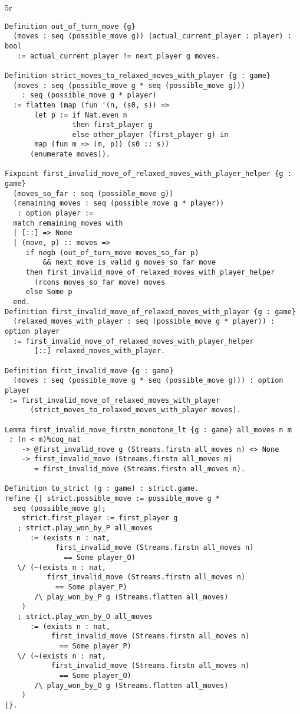 5r\documentclass{article}
\theoremstyle{definition}
\begin{document}
\begin{verbatim}
Definition out_of_turn_move {g}
  (moves : seq (possible_move g)) (actual_current_player : player) : bool
   := actual_current_player != next_player g moves.

Definition strict_moves_to_relaxed_moves_with_player {g : game}
  (moves : seq (possible_move g * seq (possible_move g)))
    : seq (possible_move g * player)
  := flatten (map (fun '(n, (s0, s)) =>
       let p := if Nat.even n
                then first_player g
                else other_player (first_player g) in
       map (fun m => (m, p)) (s0 :: s))
      (enumerate moves)).

Fixpoint first_invalid_move_of_relaxed_moves_with_player_helper {g : game}
  (moves_so_far : seq (possible_move g))
  (remaining_moves : seq (possible_move g * player))
   : option player := 
  match remaining_moves with 
  | [::] => None
  | (move, p) :: moves => 
     if negb (out_of_turn_move moves_so_far p)
         && next_move_is_valid g moves_so_far move 
     then first_invalid_move_of_relaxed_moves_with_player_helper 
       (rcons moves_so_far move) moves
     else Some p
  end.
Definition first_invalid_move_of_relaxed_moves_with_player {g : game}
  (relaxed_moves_with_player : seq (possible_move g * player)) : option player
  := first_invalid_move_of_relaxed_moves_with_player_helper
       [::] relaxed_moves_with_player.

Definition first_invalid_move {g : game}
  (moves : seq (possible_move g * seq (possible_move g))) : option player
 := first_invalid_move_of_relaxed_moves_with_player
      (strict_moves_to_relaxed_moves_with_player moves).  

Lemma first_invalid_move_firstn_monotone_lt {g : game} all_moves n m
 : (n < m)%coq_nat
    -> @first_invalid_move g (Streams.firstn all_moves n) <> None
    -> first_invalid_move (Streams.firstn all_moves m)
       = first_invalid_move (Streams.firstn all_moves n).
       
Definition to_strict (g : game) : strict.game.
refine {| strict.possible_move := possible_move g * 
  seq (possible_move g);
    strict.first_player := first_player g
   ; strict.play_won_by_P all_moves
      := (exists n : nat,
            first_invalid_move (Streams.firstn all_moves n) 
              == Some player_O) 
   \/ (~(exists n : nat,
          first_invalid_move (Streams.firstn all_moves n) 
            == Some player_P)
       /\ play_won_by_P g (Streams.flatten all_moves)
    ) 
   ; strict.play_won_by_O all_moves
      := (exists n : nat,
           first_invalid_move (Streams.firstn all_moves n) 
             == Some player_P) 
   \/ (~(exists n : nat,
           first_invalid_move (Streams.firstn all_moves n) 
             == Some player_O)
       /\ play_won_by_O g (Streams.flatten all_moves)
    )
|}.
\end{verbatim}
\end{document}

